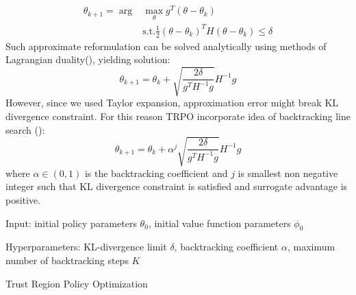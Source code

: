 \begin{align*}
  \theta_{k+1} = \arg &\max_\theta g^T(\theta - \theta_k)   \\  
  &\text{s.t.}  \frac{1}{2} (\theta-\theta_k)^TH(\theta-\theta_k) \leq \delta
\end{align*}
Such approximate reformulation can be solved analytically using methods of Lagrangian duality(\cite{LagrangDuality}), yielding solution:
\[\theta_{k+1} = \theta_k + \sqrt{\frac{2\delta}{g^TH^{-1}g}}H^{-1}g\]
However, since we used Taylor expansion, approximation error might break KL divergence constraint.
For this reason TRPO incorporate idea of backtracking line search (\cite{BacktrackingLineSearch}):
\[\theta_{k+1} = \theta_k + \alpha^j \sqrt{\frac{2\delta}{g^TH^{-1}g}}H^{-1}g\]
where $\alpha \in (0,1)$ is the backtracking coefficient and $j$ is smallest non negative integer such that KL divergence constraint is satisfied and surrogate advantage is positive.


\begin{algorithm}[H]
  Input: initial policy parameters $\theta_0$, initial value function parameters $\phi_0$

  Hyperparameters: KL-divergence limit $\delta$, backtracking coefficient $\alpha$, maximum number of backtracking steps $K$
  
  
  \caption{Trust Region Policy Optimization}
  \label{TRPO}
\end{algorithm}


